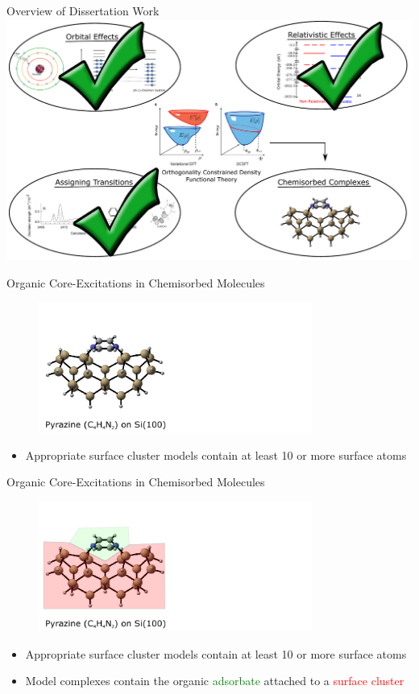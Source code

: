 \documentclass[t]{beamer}
\begin{document}
\begin{frame}{Overview of Dissertation Work}
\centering
\includegraphics[width=\linewidth]{project_intro_4.pdf}
\end{frame}

\begin{frame}{Organic Core-Excitations in Chemisorbed Molecules}
\begin{figure}
\includegraphics[width=0.8\textwidth]{pyrazine_si_100_slide_1.pdf}
\end{figure}
\begin{itemize}
\item Appropriate surface cluster models contain at least 10 or more surface atoms
\end{itemize}
\end{frame}

\begin{frame}{Organic Core-Excitations in Chemisorbed Molecules}
\begin{figure}
\includegraphics[width=0.8\textwidth]{pyrazine_si_100_slide_2.pdf}
\end{figure}
\begin{itemize}
\item Appropriate surface cluster models contain at least 10 or more surface atoms
\item Model complexes contain the organic \textcolor{green}{adsorbate} attached to a \textcolor{red}{surface cluster}
\end{itemize}
\end{frame}
\end{document}
